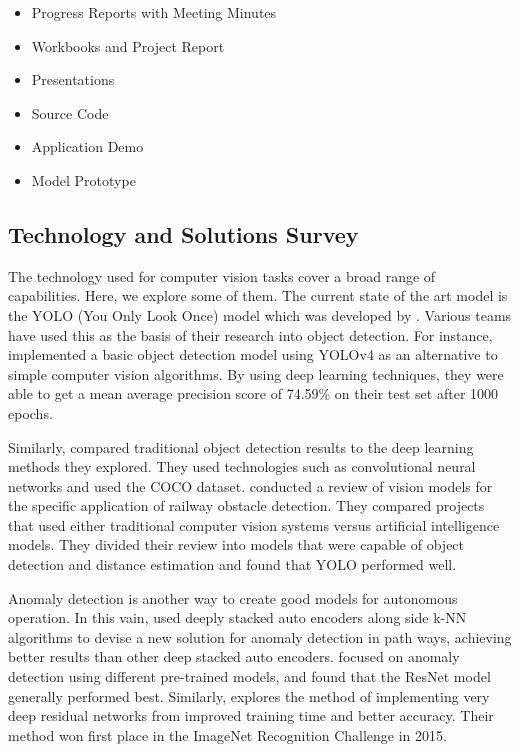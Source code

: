 \documentclass[stu,12pt,floatsintext]{apa7}
\begin{document}
\begin{itemize}
    \item Progress Reports with Meeting Minutes 
    \item Workbooks and Project Report
    \item Presentations
    \item Source Code
    \item Application Demo
    \item Model Prototype
\end{itemize}


\subsection{Technology and Solutions Survey}
The technology used for computer vision tasks cover a broad range of capabilities. Here, we explore some of them. The current state of the art model is the YOLO (You Only Look Once) model which was developed by \textcite{redmon_you_2016}. Various teams have used this as the basis of their research into object detection. For instance, \textcite{sarda_object_2021} implemented a basic object detection model using YOLOv4 as an alternative to simple computer vision algorithms. By using deep learning techniques, they were able to get a mean average precision score of 74.59\% on their test set after 1000 epochs.

Similarly, \textcite{gao_obstacle_2024} compared traditional object detection results to the deep learning methods they explored. They used technologies such as convolutional neural networks and used the COCO dataset. \textcite{ristic-durrant_review_2021} conducted a review of vision models for the specific application of railway obstacle detection. They compared projects that used either traditional computer vision systems versus artificial intelligence models. They divided their review into models that were capable of object detection and distance estimation and found that YOLO performed well.

Anomaly detection is another way to create good models for autonomous operation. In this vain, \textcite{dairi_obstacle_2018} used deeply stacked auto encoders along side k-NN algorithms to devise a new solution for anomaly detection in path ways, achieving better results than other deep stacked auto encoders. \textcite{wenning_anomaly_2022} focused on anomaly detection using different pre-trained models, and found that the ResNet model generally performed best. Similarly, \textcite{he_deep_2016} explores the method of implementing very deep residual networks from improved training time and better accuracy. Their method won first place in the ImageNet Recognition Challenge in 2015.
\end{document}
